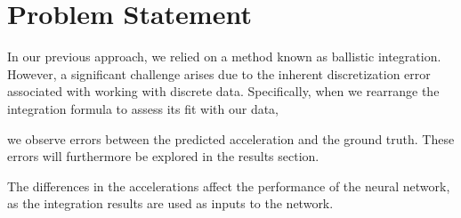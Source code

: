 \section{Problem Statement}
In our previous approach, we relied on a method known as ballistic integration. 
However, a significant challenge arises due to the inherent discretization error associated with working with discrete data.
Specifically, when we rearrange the integration formula to assess its fit with our data, 

we observe errors between the predicted acceleration and the ground truth.
These errors will furthermore be explored in the results section.

The differences in the accelerations affect the performance of the neural network, 
as the integration results are used as inputs to the network.

